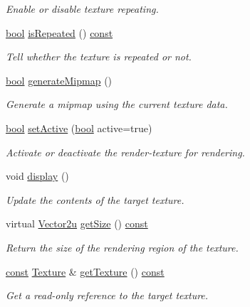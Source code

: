 \begin{DoxyCompactItemize}
\begin{DoxyCompactList}\small\item\em Enable or disable texture repeating. \end{DoxyCompactList}\item 
\hyperlink{term__entry_8h_a002004ba5d663f149f6c38064926abac}{bool} \hyperlink{classsf_1_1_render_texture_ae480a2ec7ee166afa50232e634d2668c}{is\-Repeated} () \hyperlink{term__entry_8h_a57bd63ce7f9a353488880e3de6692d5a}{const} 
\begin{DoxyCompactList}\small\item\em Tell whether the texture is repeated or not. \end{DoxyCompactList}\item 
\hyperlink{term__entry_8h_a002004ba5d663f149f6c38064926abac}{bool} \hyperlink{classsf_1_1_render_texture_a8ca34c8b7e00793c1d3ef4f9a834f8cc}{generate\-Mipmap} ()
\begin{DoxyCompactList}\small\item\em Generate a mipmap using the current texture data. \end{DoxyCompactList}\item 
\hyperlink{term__entry_8h_a002004ba5d663f149f6c38064926abac}{bool} \hyperlink{classsf_1_1_render_texture_a5da95ecdbce615a80bb78399012508cf}{set\-Active} (\hyperlink{term__entry_8h_a002004ba5d663f149f6c38064926abac}{bool} active=true)
\begin{DoxyCompactList}\small\item\em Activate or deactivate the render-\/texture for rendering. \end{DoxyCompactList}\item 
void \hyperlink{classsf_1_1_render_texture_af92886d5faef3916caff9fa9ab32c555}{display} ()
\begin{DoxyCompactList}\small\item\em Update the contents of the target texture. \end{DoxyCompactList}\item 
virtual \hyperlink{namespacesf_a41039649eb65ea7646e2b97cfe124b4f}{Vector2u} \hyperlink{classsf_1_1_render_texture_a757ba45ec7a7deefcaef717049b00b8c}{get\-Size} () \hyperlink{term__entry_8h_a57bd63ce7f9a353488880e3de6692d5a}{const} 
\begin{DoxyCompactList}\small\item\em Return the size of the rendering region of the texture. \end{DoxyCompactList}\item 
\hyperlink{term__entry_8h_a57bd63ce7f9a353488880e3de6692d5a}{const} \hyperlink{classsf_1_1_texture}{Texture} \& \hyperlink{classsf_1_1_render_texture_a95bc5152c497066d31fdc57da8e17678}{get\-Texture} () \hyperlink{term__entry_8h_a57bd63ce7f9a353488880e3de6692d5a}{const} 
\begin{DoxyCompactList}\small\item\em Get a read-\/only reference to the target texture. \end{DoxyCompactList}\end{DoxyCompactItemize}
